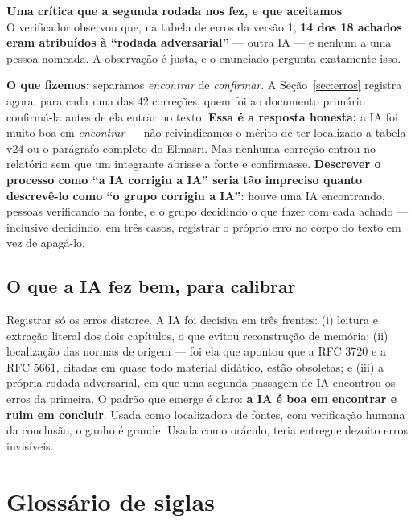 \documentclass[11pt,a4paper]{article}
\newcommand{\destaque}[2]{%
  \begin{center}\begin{minipage}{0.96\textwidth}
  \colorbox{fundo}{\begin{minipage}{\dimexpr\linewidth-2\fboxsep}
  \vspace{2pt}\textbf{\color{azul}\small #1}\\[1pt]\footnotesize #2\vspace{3pt}
  \end{minipage}}\end{minipage}\end{center}}
\begin{document}
\destaque{Uma crítica que a segunda rodada nos fez, e que aceitamos}{%
O verificador observou que, na tabela de erros da versão 1, \textbf{14 dos 18 achados eram
atribuídos à ``rodada adversarial''} --- outra IA --- e nenhum a uma pessoa nomeada. A observação é
justa, e o enunciado pergunta exatamente isso.

\smallskip
\textbf{O que fizemos:} separamos \emph{encontrar} de \emph{confirmar}. A Seção~\ref{sec:erros}
registra agora, para cada uma das 42 correções, quem foi ao documento primário confirmá-la antes de
ela entrar no texto. \textbf{Essa é a resposta honesta:} a IA foi muito boa em \emph{encontrar} ---
não reivindicamos o mérito de ter localizado a tabela v24 ou o parágrafo completo do Elmasri. Mas
nenhuma correção entrou no relatório sem que um integrante abrisse a fonte e confirmasse.
\textbf{Descrever o processo como ``a IA corrigiu a IA'' seria tão impreciso quanto descrevê-lo como
``o grupo corrigiu a IA''}: houve uma IA encontrando, pessoas verificando na fonte, e o grupo
decidindo o que fazer com cada achado --- inclusive decidindo, em três casos, registrar o próprio
erro no corpo do texto em vez de apagá-lo.}

\subsection{O que a IA fez bem, para calibrar}

Registrar só os erros distorce. A IA foi decisiva em três frentes: (i) leitura e extração literal dos
dois capítulos, o que evitou reconstrução de memória; (ii) localização das normas de origem --- foi
ela que apontou que a RFC 3720 e a RFC 5661, citadas em quase todo material didático, estão
obsoletas; e (iii) a própria rodada adversarial, em que uma segunda passagem de IA encontrou os erros
da primeira. O padrão que emerge é claro: \textbf{a IA é boa em encontrar e ruim em concluir}. Usada
como localizadora de fontes, com verificação humana da conclusão, o ganho é grande. Usada como
oráculo, teria entregue dezoito erros invisíveis.

\clearpage
\appendix
\section{Glossário de siglas}
\end{document}
